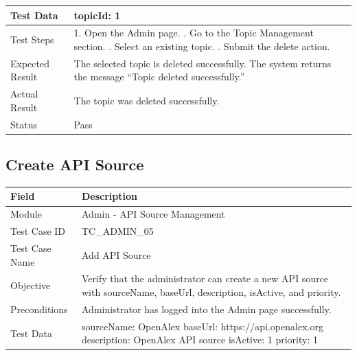 \documentclass[12pt,a4paper]{article}
\begin{document}
{{\begin{longtable}{|p{4cm}|p{10cm}|}
	Test Data &
	topicId: 1
	\\ \hline
	
	Test Steps &
	1. Open the Admin page. \newline
	2. Go to the Topic Management section. \newline
	3. Select an existing topic. \newline
	4. Submit the delete action.
	\\ \hline
	
	Expected Result &
	The selected topic is deleted successfully. The system returns the message ``Topic deleted successfully.'' \\ \hline
	
	Actual Result &
	The topic was deleted successfully. \\ \hline
	
	Status & Pass \\ \hline
	
\end{longtable}
\subsection{Create API Source}
\begin{longtable}{|p{4cm}|p{10cm}|}
	\hline
	\textbf{Field} & \textbf{Description} \\ \hline
	
	Module & Admin - API Source Management \\ \hline
	
	Test Case ID & TC\_ADMIN\_05 \\ \hline
	
	Test Case Name & Add API Source \\ \hline
	
	Objective &
	Verify that the administrator can create a new API source with sourceName, baseUrl, description, isActive, and priority. \\ \hline
	
	Preconditions &
	Administrator has logged into the Admin page successfully.
	\\ \hline
	
	Test Data &
	sourceName: OpenAlex \newline
	baseUrl: https://api.openalex.org \newline
	description: OpenAlex API source \newline
	isActive: 1 \newline
	priority: 1
	\\ \hline
	

\end{longtable}}}
\end{document}

